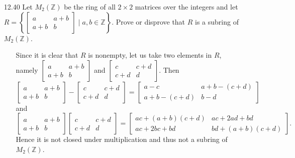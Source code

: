\documentclass[12pt]{article}
\begin{document}
\begin{enumerate}
\item[12.40] Let $M_2(\mathbb{Z})$ be the ring of all $2 \times 2$ matrices over the integers and let \\ 
$R = \left\{ \left[ 
\begin{array}{cc}
a & a + b \\
a + b & b
\end{array} \right] \mid a, b \in \mathbb{Z} \right\}$. Prove or disprove that $R$ is a subring of $M_2(\mathbb{Z})$.
\begin{enumerate}
\item[] Since it is clear that $R$ is nonempty, let us take two elements in $R$, namely 
$\left[ \begin{array}{cc}
a & a + b \\
a + b & b
\end{array} \right]$ and $\left[ \begin{array}{cc}
c & c + d \\
c + d & d
\end{array} \right]$. Then
\[
\left[ \begin{array}{cc}
a & a + b \\
a + b & b
\end{array} \right] - \left[ \begin{array}{cc}
c & c + d \\
c + d & d
\end{array} \right] =
\left[ \begin{array}{cc}
a - c & a + b - (c + d) \\
a + b - (c + d) & b - d
\end{array} \right]
\]
and
\[
\left[ \begin{array}{cc}
a & a + b \\
a + b & b
\end{array} \right] \left[ \begin{array}{cc}
c & c + d \\
c + d & d
\end{array} \right] =
\left[ \begin{array}{cc}
ac + (a+b)(c+d) & ac + 2ad + bd \\
ac + 2bc + bd & bd + (a+b)(c+d)
\end{array} \right].
\] 
Hence it is not closed under multiplication and thus not a subring of $M_2(\mathbb{Z})$.
\end{enumerate}


\end{enumerate}
\end{document}

